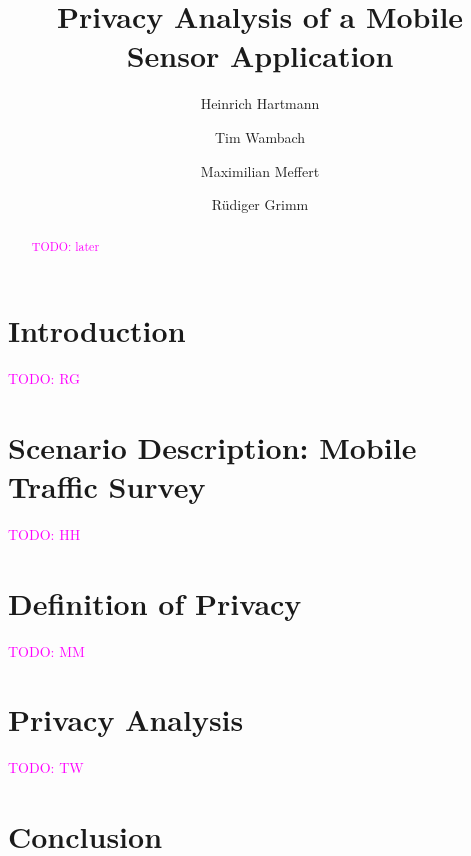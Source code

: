 \documentclass[runningheads,a4paper]{llncs}
\newcommand{\TODO}[1]{\textcolor{magenta}{TODO: #1}}
\begin{document}

\title{Privacy Analysis of a Mobile Sensor Application}
\author{Heinrich Hartmann \and Tim Wambach \and Maximilian Meffert \and R\"udiger Grimm}
\maketitle


\begin{abstract}

\TODO{later}


\end{abstract}


\section{Introduction}

\TODO{RG}


\section{Scenario Description: Mobile Traffic Survey}

\TODO{HH}



\section{Definition of Privacy}

\TODO{MM}


\section{Privacy Analysis}

\TODO{TW}



\section{Conclusion}


\thebibliography
\end{document}
